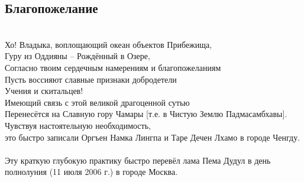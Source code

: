 \subsection*{Благопожелание}\\
Хо! Владыка, воплощающий океан объектов Прибежища,\\
Гуру из Оддияны – Рождённый в Озере,\\
Согласно твоим сердечным намерениям и благопожеланиям\\
Пусть воссияют славные признаки добродетели \\ \indent Учения и скитальцев!\\

\scriptsize
Имеющий связь с этой великой драгоценной сутью\\
Перенесётся на Славную гору Чамары [т.е. в Чистую Землю Падмасамбхавы].\\
Чувствуя настоятельную необходимость,\\
это быстро записали Оргъен Намка Лингпа и Таре Дечен Лхамо в городе Ченгду.\\
\\
Эту краткую глубокую практику быстро перевёл лама Пема Дудул
в день полнолуния (11 июля 2006 г.) в городе Москва.